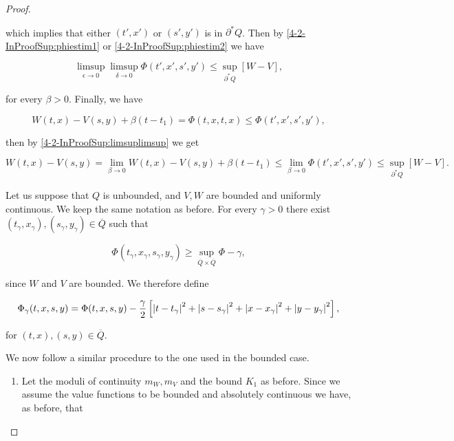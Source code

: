 \begin{proof}
\begin{enumerate}
        which implies that either $(t',x')$ or $(s',y')$ is in $\partial^{\ast}Q$. Then by \ref{4-2-InProofSup:phiestim1} 
        or \ref{4-2-InProofSup:phiestim2} we have

        \begin{equation}\label{4-2-InProofSup:limsuplimsup}
            \limsup_{\epsilon\to0}\limsup_{\delta\to0} \Phi(t',x',s',y') \leq \sup_{\partial^{\ast}Q}[W-V],
        \end{equation}

        for every $\beta>0$. Finally, we have

        \[W(t,x) - V(s,y) + \beta(t-t_1) = \Phi(t,x,t,x) \leq \Phi(t',x',s',y'),\]

        then by \ref{4-2-InProofSup:limsuplimsup} we get

        \[W(t,x) - V(s,y) = \lim_{\beta\to0}W(t,x) - V(s,y) + \beta(t-t_1)\leq \lim_{\beta\to0}\Phi(t',x',s',y')\leq \sup_{\partial^{\ast}Q}[W-V].\]
    \end{enumerate}

    Let us suppose that $Q$ is unbounded, and $V,W$ are bounded and uniformly continuous. We keep the same notation as before. For every $\gamma>0$ 
    there exist $(t_{\gamma},x_{\gamma}),(s_{\gamma},y_{\gamma})\in \overline{Q}$ such that
    
    \begin{equation}
        \Phi(t_{\gamma},x_{\gamma},s_{\gamma},y_{\gamma}) \geq \sup_{\overline{Q}\times\overline{Q}}\Phi - \gamma,
    \end{equation}

    since $W$ and $V$ are bounded. We therefore define

    \begin{equation*}
        \Phi_{\gamma}(t,x,s,y) = \Phi(t,x,s,y) - \frac{\gamma}{2}\left[\abs{t-t_{\gamma}}^2+\abs{s-s_{\gamma}}^2 + \abs{x-x_{\gamma}}^2 + \abs{y-y_{\gamma}}^2\right],
    \end{equation*}

    for $(t,x),(s,y)\in \overline{Q}$. 
    
    We now follow a similar procedure to the one used in the bounded case.

    \begin{enumerate}[label=\arabic*')]
        \item Let the moduli of continuity $m_W,m_V$ and the bound $K_1$ as before. Since we assume the value functions to be bounded and 
        absolutely continuous we have, as before, that
        

\end{enumerate}
\end{proof}
